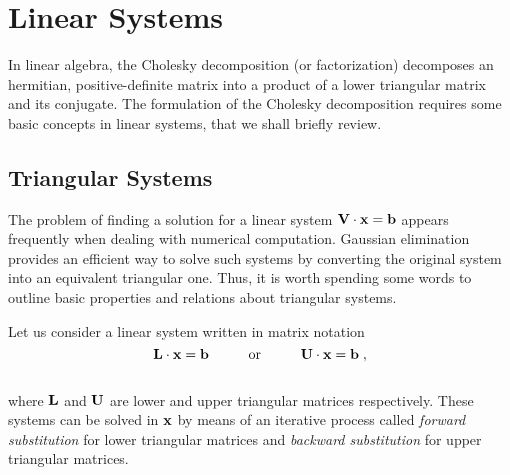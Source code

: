 \chapter{Linear Systems}
\label{app:lin_sys}

In linear algebra, the Cholesky decomposition (or factorization) decomposes an hermitian, positive-definite matrix into a product of a lower triangular matrix and its conjugate. The formulation of the Cholesky decomposition requires some basic concepts in linear systems, that we shall briefly review.

\section{Triangular Systems}
The problem of finding a solution for a linear system $\mathbf{V} \cdot \mathbf{x} = \mathbf{b}$ appears frequently when dealing with numerical computation. Gaussian elimination provides an efficient way to solve such systems by converting the  original system into an equivalent triangular one. Thus, it is worth spending some words to outline basic properties and relations about triangular systems.\par
Let us consider a linear system written in matrix notation
\\
\begin{equation}
    \mb{L} \cdot \mb{x} = \mb{b} \hspace{10mm} \textrm{or} \hspace{10mm} \mb{U} \cdot \mb{x} = \mb{b} \; ,
\end{equation}
\\
where $\mathbf{L}$ and $\mathbf{U}$ are lower and upper triangular matrices respectively. These systems can be solved in $\mathbf{x}$ by means of an iterative process called \textit{forward substitution} for lower triangular matrices and \textit{backward substitution} for upper triangular matrices. 


